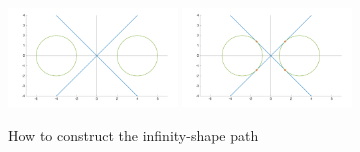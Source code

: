 \begin{figure}[!htbp]
  \centering
 {\includegraphics[width=0.4\textwidth]{img/constructionshape1_.png}\label{fig:constuctinfinity1}}
  \hfill
  {\includegraphics[width=0.4\textwidth]{img/constructionshape2_.png}\label{fig:constuctinfinity2}}
  \caption{How to construct the infinity-shape path}
\end{figure}

